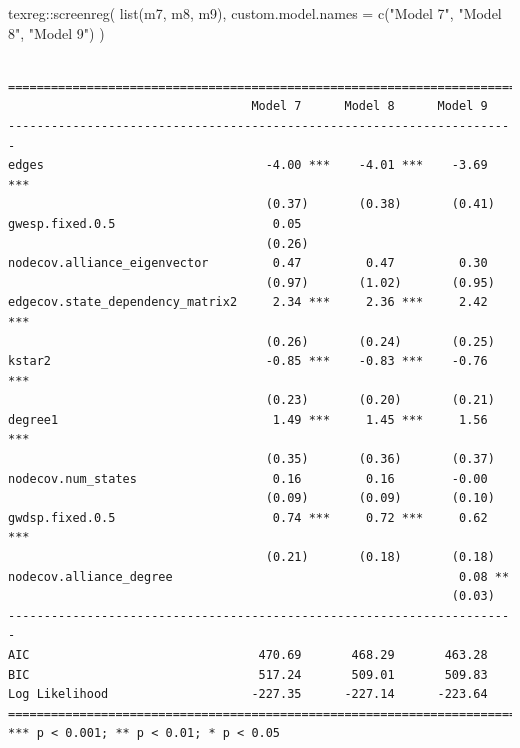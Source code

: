 \documentclass[
]{article}
\newenvironment{Shaded}{\begin{snugshade}}{\end{snugshade}}
\newcommand{\AttributeTok}[1]{\textcolor[rgb]{0.40,0.45,0.13}{#1}}
\newcommand{\FunctionTok}[1]{\textcolor[rgb]{0.28,0.35,0.67}{#1}}
\newcommand{\NormalTok}[1]{\textcolor[rgb]{0.00,0.23,0.31}{#1}}
\newcommand{\SpecialCharTok}[1]{\textcolor[rgb]{0.37,0.37,0.37}{#1}}
\newcommand{\StringTok}[1]{\textcolor[rgb]{0.13,0.47,0.30}{#1}}
\begin{document}
\begin{Shaded}
\begin{Highlighting}[]
\NormalTok{texreg}\SpecialCharTok{::}\FunctionTok{screenreg}\NormalTok{(}
  \FunctionTok{list}\NormalTok{(m7, m8, m9),}
  \AttributeTok{custom.model.names =} \FunctionTok{c}\NormalTok{(}\StringTok{"Model 7"}\NormalTok{, }\StringTok{"Model 8"}\NormalTok{, }\StringTok{"Model 9"}\NormalTok{)}
\NormalTok{)}
\end{Highlighting}
\end{Shaded}

\begin{verbatim}

=======================================================================
                                  Model 7      Model 8      Model 9    
-----------------------------------------------------------------------
edges                               -4.00 ***    -4.01 ***    -3.69 ***
                                    (0.37)       (0.38)       (0.41)   
gwesp.fixed.0.5                      0.05                              
                                    (0.26)                             
nodecov.alliance_eigenvector         0.47         0.47         0.30    
                                    (0.97)       (1.02)       (0.95)   
edgecov.state_dependency_matrix2     2.34 ***     2.36 ***     2.42 ***
                                    (0.26)       (0.24)       (0.25)   
kstar2                              -0.85 ***    -0.83 ***    -0.76 ***
                                    (0.23)       (0.20)       (0.21)   
degree1                              1.49 ***     1.45 ***     1.56 ***
                                    (0.35)       (0.36)       (0.37)   
nodecov.num_states                   0.16         0.16        -0.00    
                                    (0.09)       (0.09)       (0.10)   
gwdsp.fixed.0.5                      0.74 ***     0.72 ***     0.62 ***
                                    (0.21)       (0.18)       (0.18)   
nodecov.alliance_degree                                        0.08 ** 
                                                              (0.03)   
-----------------------------------------------------------------------
AIC                                470.69       468.29       463.28    
BIC                                517.24       509.01       509.83    
Log Likelihood                    -227.35      -227.14      -223.64    
=======================================================================
*** p < 0.001; ** p < 0.01; * p < 0.05
\end{verbatim}
\end{document}

